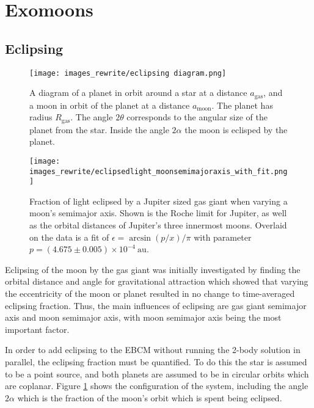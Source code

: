 \documentclass[12pt, onecolumn]{revtex4-2}    %
\begin{document}
\section{Exomoons} \label{sec:Exomoons}
\subsection{Eclipsing} \label{ssec:InvEclipsing}

\begin{figure}
  \texttt{[image: images\_rewrite/eclipsing diagram.png]}
  \caption{
    A diagram of a planet in orbit around a star at a distance $a_{\text{gas}}$, and a moon in orbit of the planet at a distance $a_{\text{moon}}$.
    The planet has radius $R_\text{gas}$.
    The angle $2\theta$ corresponds to the angular size of the planet from the star.
    Inside the angle $2\alpha$ the moon is eclisped by the planet.
  }
  \label{fig:quantitative_eclipsing}
\end{figure}

\begin{figure}
  \texttt{[image: images\_rewrite/eclipsedlight\_moonsemimajoraxis\_with\_fit.png]}
  \caption{
    Fraction of light eclipsed by a Jupiter sized gas giant when varying a moon's semimajor axis.
    Shown is the Roche limit for Jupiter, as well as the orbital distances of Jupiter's three innermost moons.
    Overlaid on the data is a fit of $\epsilon = \arcsin(p/x)/\pi$ with parameter $p = (4.675\pm0.005)\times 10^{-4}\ \text{au}$.
  }
  \label{fig:quantitative_eclipsing_moon_semimajor_axis}
\end{figure}

Eclipsing of the moon by the gas giant was initially investigated by finding the orbital distance and angle  for gravitational attraction which showed that varying the eccentricity of the moon or planet resulted in no change to time-averaged eclipsing fraction.
Thus, the main influences of eclipsing are gas giant semimajor axis and moon semimajor axis, with moon semimajor axis being the most important factor.

In order to add eclipsing to the EBCM without running the 2-body solution in parallel, the eclipsing fraction must be quantified.
To do this the star is assumed to be a point source, and both planets are assumed to be in circular orbits which are coplanar.
Figure \ref{fig:quantitative_eclipsing} shows the configuration of the system, including the angle $2\alpha$ which is the fraction of the moon's orbit which is spent being eclipsed.
\end{document}
